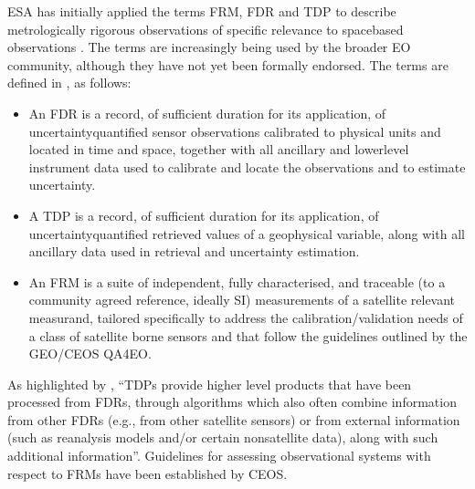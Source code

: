 \documentclass[a4paper,10pt,english]{sphinxmanual}
\begin{document}
\sphinxAtStartPar
ESA has initially applied the terms FRM, FDR and TDP to describe metrologically rigorous observations of specific relevance to space\sphinxhyphen{}based observations {\hyperref[\detokenize{04_uncertainty_analysis:ref-qa4eo2}]{}}. The terms are increasingly being used by the broader EO community, although they have not yet been formally endorsed. The terms are defined in {\hyperref[\detokenize{04_uncertainty_analysis:ref-qa4eo2}]{}}, as follows:
\begin{itemize}
\item {} 
\sphinxAtStartPar
{} An FDR is a record, of sufficient duration for its application, of uncertainty\sphinxhyphen{}quantified sensor observations calibrated to physical units and located in time and space, together with all ancillary and lower\sphinxhyphen{}level instrument data used to calibrate and locate the observations and to estimate uncertainty.

\item {} 
\sphinxAtStartPar
{} A TDP is a record, of sufficient duration for its application, of uncertainty\sphinxhyphen{}quantified retrieved values of a geophysical variable, along with all ancillary data used in retrieval and uncertainty estimation.

\item {} 
\sphinxAtStartPar
{} An FRM is a suite of independent, fully characterised, and traceable (to a community agreed reference, ideally SI) measurements of a satellite relevant measurand, tailored specifically to address the calibration/validation needs of a class of satellite borne sensors and that follow the guidelines outlined by the GEO/CEOS QA4EO.

\end{itemize}

\sphinxAtStartPar
As highlighted by {\hyperref[\detokenize{04_uncertainty_analysis:ref-qa4eo2}]{}}, “TDPs provide higher level products that have been processed from FDRs, through algorithms which also often combine information from other FDRs (e.g., from other satellite sensors) or from external information (such as reanalysis models and/or certain non\sphinxhyphen{}satellite data), along with such additional information”. Guidelines for assessing observational systems with respect to FRMs have been established by CEOS.
\end{document}
